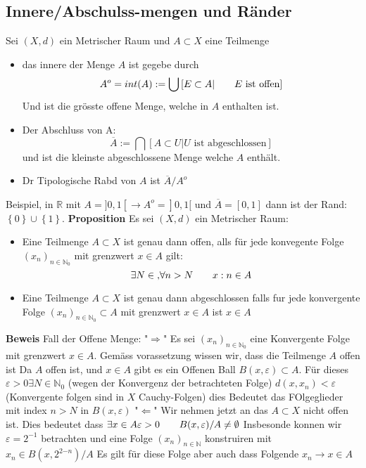 \documentclass{article}
\newcommand{\mspc}{\hspace{0.7cm}}
\begin{document}
\subsection{Innere/Abschulss-mengen und Ränder}
Sei $(X,d)$ ein Metrischer Raum und $A\subset X$ eine Teilmenge
\begin{itemize}
\item{das innere der Menge $A$ ist gegebe durch \[A^o=int(A):=\bigcup\left[E\subset A|\mspc E \text{ ist offen}\right]\] Und ist die grösste offene Menge, welche in $A$ enthalten ist.}
\item{Der Abschluss von A:\[\overline{A}
:=\bigcap \left[A\subset U|U \text{ ist abgeschlossen}\right]\] und ist die kleinste abgeschlossene Menge welche $A$ enthält.}
\item{Dr Tipologische Rabd von $A$ ist $\overline{A}/A^o$}
\end{itemize}
Beispiel, in $\mathbb{R}$ mit $A=]0,1[\rightarrow A^o=]0,1[$ und $\overline{A}=[0,1]$ dann ist der Rand: $\left\lbrace 0\right\rbrace\cup\left\lbrace1\right\rbrace$.\newline
\textbf{Proposition} Es sei $(X,d)$ ein Metrischer Raum:
\begin{itemize}
\item{Eine Teilmenge $A\subset X$ ist genau dann offen, alls für jede konvegente Folge $(x_n)_{n\in\mathbb{N}_0}$ mit grenzwert $x\in A$ gilt:\[\exists N\in\mathbb, \forall n>N \mspc x:n\in A\]}
\item{Eine Teilmenge $A\subset X$ ist genau dann abgeschlossen falls fur jede konvergente Folge $(x_n)_{n\in\mathbb{N}_0}\subset A$ mit grenzwert $x\in A$ ist $x\in A$}
\end{itemize}
\textbf{Beweis} Fall der Offene Menge:\newline
"$\Rightarrow$" Es sei $(x_n)_{n\in\mathbb{N}_0 }$ eine Konvergente Folge mit grenzwert $x\in A$. Gemäss vorassetzung wissen wir, dass die Teilmenge $A$ offen ist Da $A$ offen ist, und $x\in A$ gibt es ein Offenen Ball $B(x,\varepsilon)\subset A$. Für dieses $\varepsilon>0 \exists N\in\mathbb{N}_0$ (wegen der Konvergenz der betrachteten Folge) $d(x,x_n)<\varepsilon$ (Konvergente folgen sind in $X$ Cauchy-Folgen) dies Bedeutet das FOlgeglieder 
mit index $n>N$ in $B(x,\varepsilon)$\newline
"$\Leftarrow$" Wir nehmen jetzt an das $A\subset X$ nicht offen ist. Dies bedeutet dass $\exists x\in A \varepsilon>0 \mspc B(x,\varepsilon)/A\neq\emptyset$
Insbesonde konnen wir $\varepsilon=2^{-1}$ betrachten und eine Folge $(x_n)_{n\in\mathbb{N}}$ konstruiren mit $x_n\in B(x,2^{2{-n}})/A$ Es gilt für diese Folge aber auch dass Folgende $x_n\rightarrow x\in A$ \newline
\end{document}
